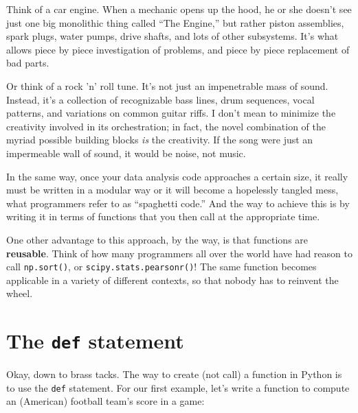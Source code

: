 Think of a car engine. When a mechanic opens up the hood, he or she doesn't see
just one big monolithic thing called ``The Engine,'' but rather piston
assemblies, spark plugs, water pumps, drive shafts, and lots of other
subsystems. It's what allows piece by piece investigation of problems, and
piece by piece replacement of bad parts.


Or think of a rock 'n' roll tune. It's not just an impenetrable mass of sound.
Instead, it's a collection of recognizable bass lines, drum sequences, vocal
patterns, and variations on common guitar riffs. I don't mean to minimize the
creativity involved in its orchestration; in fact, the novel combination of the
myriad possible building blocks \textit{is} the creativity. If the song were
just an impermeable wall of sound, it would be noise, not music.



In the same way, once your data analysis code approaches a certain size, it
really must be written in a modular way or it will become a hopelessly tangled
mess, what programmers refer to as ``spaghetti code.'' And the way to achieve
this is by writing it in terms of functions that you then call at the
appropriate time.


One other advantage to this approach, by the way, is that functions are
\textbf{reusable}. Think of how many programmers all over the world
have had reason to call \texttt{np.sort()}, or \texttt{scipy.stats.pearsonr()}!
The same function becomes applicable in a variety of different contexts, so
that nobody has to reinvent the wheel.

\section{The \texttt{def} statement}


Okay, down to brass tacks. The way to create (not call) a function in Python is
to use the \texttt{def} statement. For our first example, let's write a
function to compute an (American) football team's score in a game:



